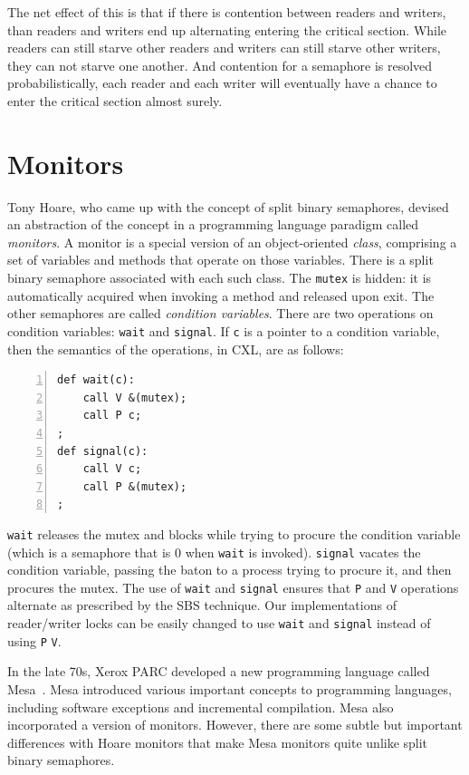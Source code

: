 \documentclass{report}
\newenvironment{code}{
\tcolorbox
}{
\endtcolorbox
}
\begin{document}
The net effect of this is that if there is contention between readers and
writers, than readers and writers end up alternating entering the critical
section.  While readers can still starve other readers and writers can still
starve other writers, they can not starve one another.  And contention for
a semaphore is resolved probabilistically, each reader and each writer will
eventually have a chance to enter the critical section almost surely.

\chapter{Monitors}
\label{ch:monitors}

Tony Hoare, who came up with the concept of split binary semaphores, devised
an abstraction of the concept in a programming language paradigm called
\emph{monitors}.
A monitor is a special version of an object-oriented \emph{class}, comprising
a set of variables and methods that operate on those variables.
There is a split binary semaphore associated with each such class.
The \texttt{mutex} is hidden: it is automatically acquired when invoking a
method and released upon exit.
The other semaphores are called \emph{condition variables}.
There are two operations on condition variables: \texttt{wait} and \texttt{signal}.
If \texttt{c} is a pointer to a condition variable, then the semantics of the
operations, in CXL, are as follows:

\begin{code} 
\begin{Verbatim}[xleftmargin=5mm,numbers=left]
def wait(c):
    call V &(mutex);
    call P c;
;
def signal(c):
    call V c;
    call P &(mutex);
;
\end{Verbatim} 
\end{code} 

\texttt{wait} releases the mutex and blocks while trying
to procure the condition variable (which is a semaphore that is 0 when
\texttt{wait} is invoked).
\texttt{signal} vacates the condition variable, passing the baton to
a process trying to procure it, and then procures the mutex.
The use of \texttt{wait} and \texttt{signal} ensures that \texttt{P} and
\texttt{V} operations alternate as prescribed by the SBS technique.
Our implementations of reader/writer locks can be easily changed to
use \texttt{wait} and \texttt{signal} instead of using \texttt{P}
\texttt{V}.

In the late 70s, Xerox PARC developed a new programming language called
Mesa~\cite{LR80}.
Mesa introduced various important concepts to programming languages,
including software exceptions and incremental compilation.  Mesa also
incorporated a version of monitors.
However, there are some subtle but important differences with Hoare
monitors that make Mesa monitors quite unlike split binary semaphores.
\end{document}
